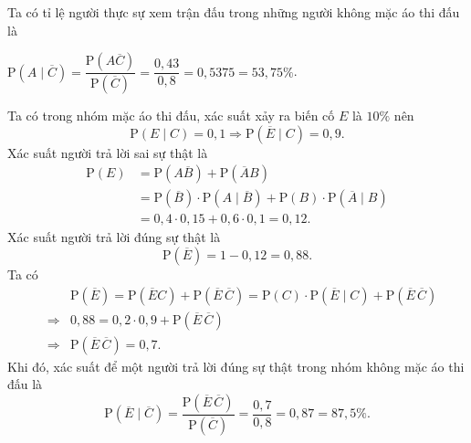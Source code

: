 \begin{ex}
{\begin{itemchoice}
				Ta có tỉ lệ người thực sự xem trận đấu trong những người không mặc áo thi đấu là
				\begin{center}
						$\mathrm{P}\left(A\mid\overline{C} \right)=\dfrac{\mathrm{P}\left(A\overline{C}\right)}{\mathrm{P}\left(\overline{C}\right)}=\dfrac{0{,}43}{0{,}8}=0{,}5375=53{,}75\%$.
				\end{center}
	\itemch  Ta có trong nhóm mặc áo thi đấu, xác suất xảy ra biến cố $E$ là $10\%$ nên 
	\[\mathrm{P}\left( E\mid C\right)=0{,}1\Rightarrow \mathrm{P}\left(\overline{E}\mid C\right)=0{,}9.\]
				Xác suất người trả lời sai sự thật là
				\begin{align*}
					\mathrm{P}(E)&=\mathrm{P}\left(A\overline{B}\right)+\mathrm{P}\left(\overline{A}B\right)\\
					&=\mathrm{P}\left(\overline{B}\right)\cdot\mathrm{P}\left(A\mid\overline{B}\right)+\mathrm{P}\left(B\right)\cdot\mathrm{P}\left(\overline{A}\mid B\right)\\
					&=0{,}4\cdot 0{,}15+0{,}6\cdot 0{,}1=0{,}12.	
				\end{align*}
				Xác suất người trả lời đúng sự thật là 
				\[\mathrm{P}\left(\overline{E}\right)=1-0{,}12=0{,}88.\]
			Ta có 
			\begin{eqnarray*}
			&&\mathrm{P}\left(\overline{E}\right)=\mathrm{P}\left(\overline{E}C\right)+\mathrm{P}\left(\overline{E}\,\overline{C}\right)=\mathrm{P}\left(C\right)\cdot\mathrm{P}\left(\overline{E}\mid C\right)+\mathrm{P}\left(\overline{E}\,\overline{C}\right)\\
			&\Rightarrow&0{,}88=0{,}2\cdot0{,}9+\mathrm{P}\left(\overline{E}\,\overline{C}\right)\\
			&\Rightarrow&\mathrm{P}\left(\overline{E}\,\overline{C}\right)=0{,}7.
			\end{eqnarray*}
				Khi đó, xác suất để một người trả lời đúng sự thật trong nhóm không mặc áo thi đấu là
				\[\mathrm{P}\left(\overline{E}\mid\overline{C}\right)=\dfrac{\mathrm{P}\left(\overline{E}\,\overline{C}\right)}{\mathrm{P}\left(\overline{C}\right)}=\dfrac{0{,}7}{0{,}8}=0{,}87 =87{,}5\%.\]
		\end{itemchoice}
	}
\end{ex}

